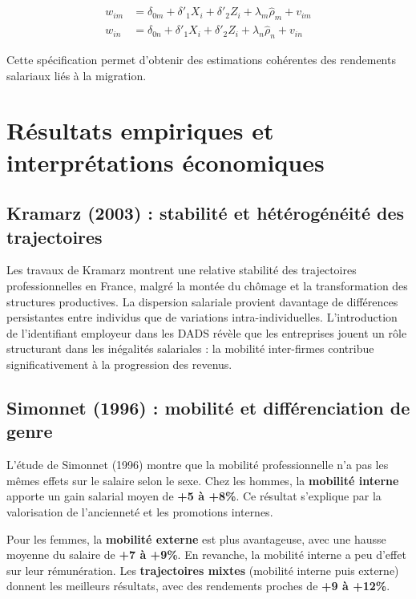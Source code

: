 \documentclass[12pt,a4paper]{article}
\begin{document}
\begin{align}
w_{im} &= \delta_{0m} + \delta'_1 X_i + \delta'_2 Z_i + \lambda_m \hat{\rho}_m + v_{im} \\
w_{in} &= \delta_{0n} + \delta'_1 X_i + \delta'_2 Z_i + \lambda_n \hat{\rho}_n + v_{in}
\end{align}

Cette spécification permet d’obtenir des estimations cohérentes des rendements salariaux liés à la migration.

\section{Résultats empiriques et interprétations économiques}

\subsection{Kramarz (2003) : stabilité et hétérogénéité des trajectoires}

Les travaux de Kramarz montrent une relative stabilité des trajectoires professionnelles en France, malgré la montée du chômage et la transformation des structures productives.  
La dispersion salariale provient davantage de différences persistantes entre individus que de variations intra-individuelles.  
L’introduction de l’identifiant employeur dans les DADS révèle que les entreprises jouent un rôle structurant dans les inégalités salariales : la mobilité inter-firmes contribue significativement à la progression des revenus.

\subsection{Simonnet (1996) : mobilité et différenciation de genre}

L’étude de Simonnet (1996) montre que la mobilité professionnelle n’a pas les mêmes effets sur le salaire selon le sexe.  
Chez les hommes, la \textbf{mobilité interne} apporte un gain salarial moyen de \textbf{+5 à +8\%}. Ce résultat s’explique par la valorisation de l’ancienneté et les promotions internes.  

Pour les femmes, la \textbf{mobilité externe} est plus avantageuse, avec une hausse moyenne du salaire de \textbf{+7 à +9\%}. En revanche, la mobilité interne a peu d’effet sur leur rémunération. Les \textbf{trajectoires mixtes} (mobilité interne puis externe) donnent les meilleurs résultats, avec des rendements proches de \textbf{+9 à +12\%}.  
\end{document}
